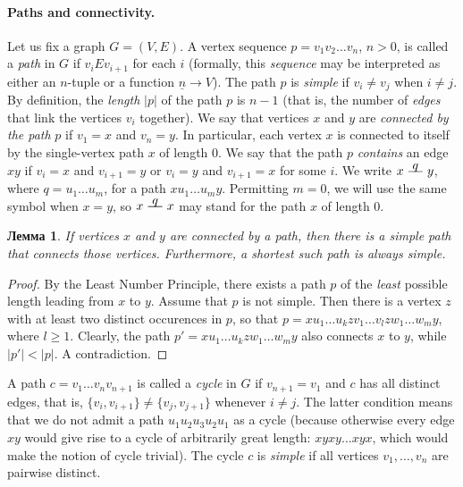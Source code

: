 \documentclass[12pt,notitlepage]{article}
\theoremstyle{plain}
\newtheorem{lemma}[thm]{Лемма}
\theoremstyle{definition}
\theoremstyle{plain}
\newcommand{\ul}[1]{\underline{#1}}
\newcommand{\1}{\mathbf{1}}
\newcommand{\0}{\mathbf{0}}
\newcommand{\pth}[1]{\overset{\raisebox{0.25em}{$ #1 $}}{\relbar\hspace{-.8mm}\relbar}}
\begin{document}
\paragraph{Paths and connectivity.} Let us fix a graph $G = (V, E)$. A vertex sequence $p = v_1 v_2 \ldots v_n$, $n > 0$, is called a \emph{path} in $G$ if $v_i E v_{i + 1}$ for each $i$ (formally, this \emph{sequence} may be interpreted as either an $n$-tuple or a function $\ul{n} \to V$). The path $p$ is \emph{simple} if $v_i \neq v_j$ when $i \neq j$. By definition, the \emph{length} $|p|$ of the path $p$ is $n - 1$ (that is, the number of \emph{edges} that link the vertices $v_i$ together). We say that vertices $x$ and $y$ are \emph{connected by the path} $p$ if $v_1 = x$ and $v_n = y$. In particular, each vertex $x$ is connected to itself by the single-vertex path $x$ of length $0$. We say that the path $p$ \emph{contains} an edge $xy$ if $v_i = x$ and $v_{i + 1} = y$ or $v_i = y$ and $v_{i + 1} = x$ for some $i$. We write $x \pth{q} y$, where $q = u_1 \ldots u_m$, for a path $x u_1 \ldots u_m y$. Permitting $m = 0$, we will use the same symbol when $x = y$, so $x \pth{q} x$ may stand for the path $x$ of length $0$.

\begin{lemma}\label{L14:simpl_path}
	If vertices $x$ and $y$ are connected by a path, then there is a \emph{simple} path that connects those vertices. Furthermore, a shortest such path is always simple.
\end{lemma}
\begin{proof}
	By the Least Number Principle, there exists a path $p$ of the \emph{least} possible length leading from $x$ to $y$. Assume that $p$ is not simple. Then there is a vertex $z$ with at least two distinct occurences in $p$, so that $p = x u_1 \ldots u_k z v_1 \ldots v_l z w_1 \ldots w_m y$, where $l \geq 1$. Clearly, the path $p' = x u_1 \ldots u_k z w_1 \ldots w_m y$ also connects $x$ to $y$, while $|p'| < |p|$. A contradiction.
\end{proof}

A path $c = v_1 \ldots v_n v_{n + 1}$ is called a \emph{cycle} in $G$ if $v_{n + 1} = v_1$ and $c$ has all distinct edges, that is, $\{ v_i, v_{i+1} \} \neq \{ v_j, v_{j + 1}\}$ whenever $i \neq j$. The latter condition means that we do not admit a path $u_1 u_2 u_3 u_2 u_1$ as a cycle (because otherwise every edge $x y$ would give rise to a cycle of arbitrarily great length: $x y x y \ldots x y x$, which would make the notion of cycle trivial). The cycle $c$ is \emph{simple} if all vertices $v_1, \ldots, v_n$ are pairwise distinct.
\end{document}
